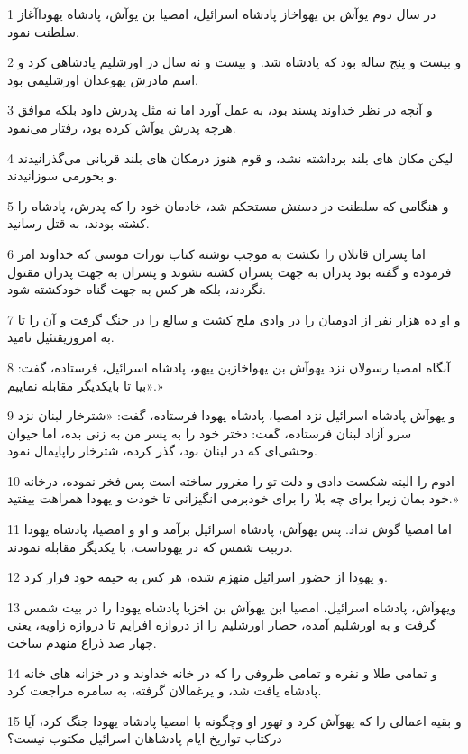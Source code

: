 \par 1 در سال دوم یوآش بن یهواخاز پادشاه اسرائیل، امصیا بن یوآش، پادشاه یهوداآغاز سلطنت نمود.
\par 2 و بیست و پنج ساله بود که پادشاه شد. و بیست و نه سال در اورشلیم پادشاهی کرد و اسم مادرش یهوعدان اورشلیمی بود.
\par 3 و آنچه در نظر خداوند پسند بود، به عمل آورد اما نه مثل پدرش داود بلکه موافق هر‌چه پدرش یوآش کرده بود، رفتار می‌نمود.
\par 4 لیکن مکان های بلند برداشته نشد، و قوم هنوز درمکان های بلند قربانی می‌گذرانیدند و بخورمی سوزانیدند.
\par 5 و هنگامی که سلطنت در دستش مستحکم شد، خادمان خود را که پدرش، پادشاه را کشته بودند، به قتل رسانید.
\par 6 اما پسران قاتلان را نکشت به موجب نوشته کتاب تورات موسی که خداوند امر فرموده و گفته بود پدران به جهت پسران کشته نشوند و پسران به جهت پدران مقتول نگردند، بلکه هر کس به جهت گناه خودکشته شود.
\par 7 و او ده هزار نفر از ادومیان را در وادی ملح کشت و سالع را در جنگ گرفت و آن را تا به امروزیقتئیل نامید.
\par 8 آنگاه امصیا رسولان نزد یهوآش بن یهواخازبن ییهو، پادشاه اسرائیل، فرستاده، گفت: «بیا تا بایکدیگر مقابله نماییم.»
\par 9 و یهوآش پادشاه اسرائیل نزد امصیا، پادشاه یهودا فرستاده، گفت: «شترخار لبنان نزد سرو آزاد لبنان فرستاده، گفت: دختر خود را به پسر من به زنی بده، اما حیوان وحشی‌ای که در لبنان بود، گذر کرده، شترخار راپایمال نمود.
\par 10 ادوم را البته شکست دادی و دلت تو را مغرور ساخته است پس فخر نموده، درخانه خود بمان زیرا برای چه بلا را برای خودبرمی انگیزانی تا خودت و یهودا همراهت بیفتید.»
\par 11 اما امصیا گوش نداد. پس یهوآش، پادشاه اسرائیل برآمد و او و امصیا، پادشاه یهودا دربیت شمس که در یهوداست، با یکدیگر مقابله نمودند.
\par 12 و یهودا از حضور اسرائیل منهزم شده، هر کس به خیمه خود فرار کرد.
\par 13 ویهوآش، پادشاه اسرائیل، امصیا ابن یهوآش بن اخزیا پادشاه یهودا را در بیت شمس گرفت و به اورشلیم آمده، حصار اورشلیم را از دروازه افرایم تا دروازه زاویه، یعنی چهار صد ذراع منهدم ساخت.
\par 14 و تمامی طلا و نقره و تمامی ظروفی را که در خانه خداوند و در خزانه های خانه پادشاه یافت شد، و یرغمالان گرفته، به سامره مراجعت کرد.
\par 15 و بقیه اعمالی را که یهوآش کرد و تهور او وچگونه با امصیا پادشاه یهودا جنگ کرد، آیا درکتاب تواریخ ایام پادشاهان اسرائیل مکتوب نیست؟

